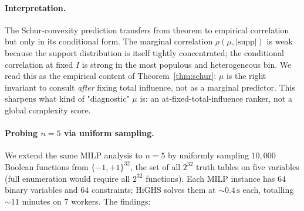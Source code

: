 \documentclass[11pt]{article}
\newcommand{\supp}{\mathrm{supp}}
\begin{document}
\paragraph{Interpretation.}
The Schur-convexity prediction transfers from theorem to empirical correlation but only in its conditional form. The marginal correlation $\rho(\mu, |\supp|)$ is weak because the support distribution is itself tightly concentrated; the conditional correlation at fixed $I$ is strong in the most populous and heterogeneous bin. We read this as the empirical content of Theorem~\ref{thm:schur}: $\mu$ is the right invariant to consult \emph{after} fixing total influence, not as a marginal predictor. This sharpens what kind of "diagnostic" $\mu$ is: an at-fixed-total-influence ranker, not a global complexity score.

\paragraph{Probing $n=5$ via uniform sampling.}
We extend the same MILP analysis to $n=5$ by uniformly sampling $10{,}000$ Boolean functions from $\{-1, +1\}^{32}$, the set of all $2^{32}$ truth tables on five variables (full enumeration would require all $2^{32}$ functions). Each MILP instance has $64$ binary variables and $64$ constraints; HiGHS solves them at $\sim 0.4\,\text{s}$ each, totalling $\sim 11$ minutes on $7$ workers. The findings:
\end{document}
